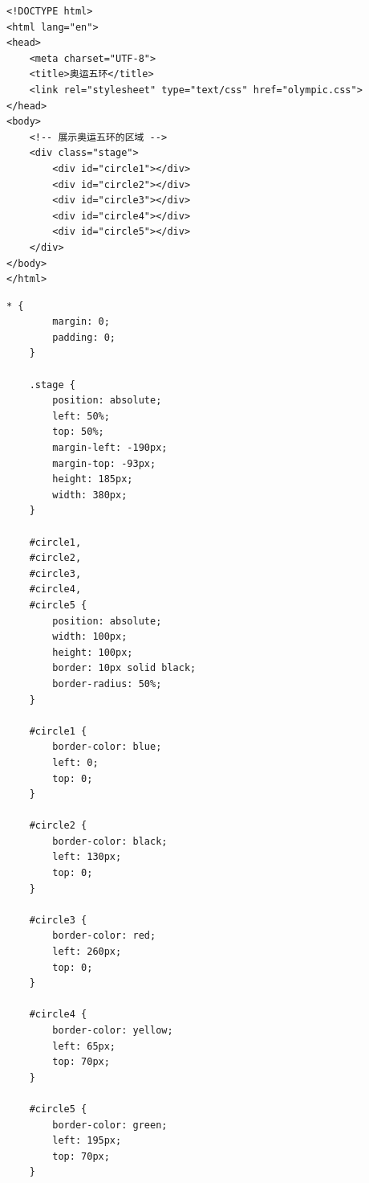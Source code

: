 \begin{lstlisting}[style=htmlcssjs, title=olympic.html]
<!DOCTYPE html>
<html lang="en">
<head>
    <meta charset="UTF-8">
    <title>奥运五环</title>
    <link rel="stylesheet" type="text/css" href="olympic.css">
</head>
<body>
    <!-- 展示奥运五环的区域 -->
    <div class="stage">
        <div id="circle1"></div>
        <div id="circle2"></div>
        <div id="circle3"></div>
        <div id="circle4"></div>
        <div id="circle5"></div>
    </div>
</body>
</html>
\end{lstlisting}

\begin{lstlisting}[style=htmlcssjs, title=olympic.css]
* {
        margin: 0;
        padding: 0;
    }
    
    .stage {
        position: absolute;
        left: 50%;
        top: 50%;
        margin-left: -190px;
        margin-top: -93px;
        height: 185px;
        width: 380px;
    }
    
    #circle1,
    #circle2,
    #circle3,
    #circle4,
    #circle5 {
        position: absolute;
        width: 100px;
        height: 100px;
        border: 10px solid black;
        border-radius: 50%;
    }
    
    #circle1 {
        border-color: blue;
        left: 0;
        top: 0;
    }
    
    #circle2 {
        border-color: black;
        left: 130px;
        top: 0;
    }
    
    #circle3 {
        border-color: red;
        left: 260px;
        top: 0;
    }
    
    #circle4 {
        border-color: yellow;
        left: 65px;
        top: 70px;
    }
    
    #circle5 {
        border-color: green;
        left: 195px;
        top: 70px;
    }
\end{lstlisting}

\newpage